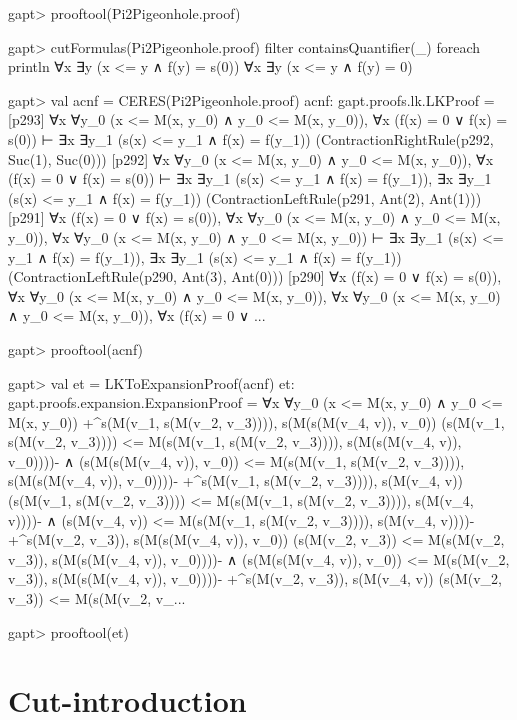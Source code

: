 \documentclass[a4paper,11pt]{book}
\begin{document}
\begin{clilisting}
gapt> prooftool(Pi2Pigeonhole.proof)

gapt> cutFormulas(Pi2Pigeonhole.proof) filter {containsQuantifier(_)} foreach println
∀x ∃y (x <= y ∧ f(y) = s(0))
∀x ∃y (x <= y ∧ f(y) = 0)

gapt> val acnf = CERES(Pi2Pigeonhole.proof)
acnf: gapt.proofs.lk.LKProof =
[p293] ∀x ∀y_0 (x <= M(x, y_0) ∧ y_0 <= M(x, y_0)),
∀x (f(x) = 0 ∨ f(x) = s(0))
⊢
∃x ∃y_1 (s(x) <= y_1 ∧ f(x) = f(y_1))    (ContractionRightRule(p292, Suc(1), Suc(0)))
[p292] ∀x ∀y_0 (x <= M(x, y_0) ∧ y_0 <= M(x, y_0)),
∀x (f(x) = 0 ∨ f(x) = s(0))
⊢
∃x ∃y_1 (s(x) <= y_1 ∧ f(x) = f(y_1)),
∃x ∃y_1 (s(x) <= y_1 ∧ f(x) = f(y_1))    (ContractionLeftRule(p291, Ant(2), Ant(1)))
[p291] ∀x (f(x) = 0 ∨ f(x) = s(0)),
∀x ∀y_0 (x <= M(x, y_0) ∧ y_0 <= M(x, y_0)),
∀x ∀y_0 (x <= M(x, y_0) ∧ y_0 <= M(x, y_0))
⊢
∃x ∃y_1 (s(x) <= y_1 ∧ f(x) = f(y_1)),
∃x ∃y_1 (s(x) <= y_1 ∧ f(x) = f(y_1))    (ContractionLeftRule(p290, Ant(3), Ant(0)))
[p290] ∀x (f(x) = 0 ∨ f(x) = s(0)),
∀x ∀y_0 (x <= M(x, y_0) ∧ y_0 <= M(x, y_0)),
∀x ∀y_0 (x <= M(x, y_0) ∧ y_0 <= M(x, y_0)),
∀x (f(x) = 0 ∨ ...

gapt> prooftool(acnf)

gapt> val et = LKToExpansionProof(acnf)
et: gapt.proofs.expansion.ExpansionProof =
∀x ∀y_0 (x <= M(x, y_0) ∧ y_0 <= M(x, y_0))
  +^{s(M(v_1, s(M(v_2, v_3)))), s(M(s(M(v_4, v)), v_0))}
    (s(M(v_1, s(M(v_2, v_3)))) <=
        M(s(M(v_1, s(M(v_2, v_3)))), s(M(s(M(v_4, v)), v_0))))- ∧
    (s(M(s(M(v_4, v)), v_0)) <=
        M(s(M(v_1, s(M(v_2, v_3)))), s(M(s(M(v_4, v)), v_0))))-
  +^{s(M(v_1, s(M(v_2, v_3)))), s(M(v_4, v))}
    (s(M(v_1, s(M(v_2, v_3)))) <= M(s(M(v_1, s(M(v_2, v_3)))), s(M(v_4, v))))- ∧
    (s(M(v_4, v)) <= M(s(M(v_1, s(M(v_2, v_3)))), s(M(v_4, v))))-
  +^{s(M(v_2, v_3)), s(M(s(M(v_4, v)), v_0))}
    (s(M(v_2, v_3)) <= M(s(M(v_2, v_3)), s(M(s(M(v_4, v)), v_0))))- ∧
    (s(M(s(M(v_4, v)), v_0)) <= M(s(M(v_2, v_3)), s(M(s(M(v_4, v)), v_0))))-
  +^{s(M(v_2, v_3)), s(M(v_4, v))}
    (s(M(v_2, v_3)) <= M(s(M(v_2, v_...

gapt> prooftool(et)

\end{clilisting}

\section{Cut-introduction}\label{sec.cut-introduction}
\end{document}
